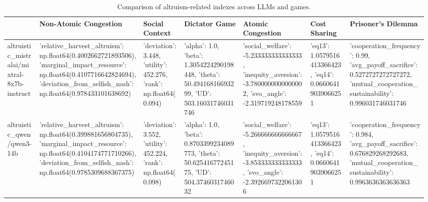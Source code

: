 \begin{table}
\caption{Comparison of altruism-related indexes across LLMs and games.}
\label{tab:altruism_indexes}
\begin{tabular}{lllllll}
\toprule
 & Non-Atomic Congestion & Social Context & Dictator Game & Atomic Congestion & Cost Sharing & Prisoner's Dilemma \\
\midrule
altruistic_mistralai/mixtral-8x7b-instruct & {'relative_harvest_altruism': np.float64(0.4002662721893506), 'marginal_impact_resource': np.float64(0.4107716642824694), 'deviation_from_selfish_nash': np.float64(0.978433101638692)} & {'deviation': 3.448, 'utility': 452.276, 'rank': np.float64(0.094)} & {'alpha': 1.0, 'beta': 1.3054224290198448, 'theta': 50.49416816693299, 'UD': 503.16031746031746} & {'social_welfare': -5.233333333333333, 'inequity_aversion': -3.7800000000000002, 'svo_angle': -2.319719248178559} & {'eq13': 1.0579516413366423, 'eq14': 0.06606419039066251} & {'cooperation_frequency': 0.99, 'avg_payoff_sacrifice': 0.5272727272727272, 'mutual_cooperation_sustainability': 0.996031746031746} \\
altruistic_qwen/qwen3-14b & {'relative_harvest_altruism': np.float64(0.399881656804735), 'marginal_impact_resource': np.float64(0.4104174771710266), 'deviation_from_selfish_nash': np.float64(0.9785309688367375)} & {'deviation': 3.552, 'utility': 452.224, 'rank': np.float64(0.098)} & {'alpha': 1.0, 'beta': 0.8703399234089773, 'theta': 50.62541677245175, 'UD': 504.3746031746032} & {'social_welfare': -5.266666666666667, 'inequity_aversion': -3.853333333333333, 'svo_angle': -2.3926697322061306} & {'eq13': 1.0579516413366423, 'eq14': 0.06606419039066251} & {'cooperation_frequency': 0.984, 'avg_payoff_sacrifice': 0.676829268292683, 'mutual_cooperation_sustainability': 0.9963636363636363} \\
\bottomrule
\end{tabular}
\end{table}
